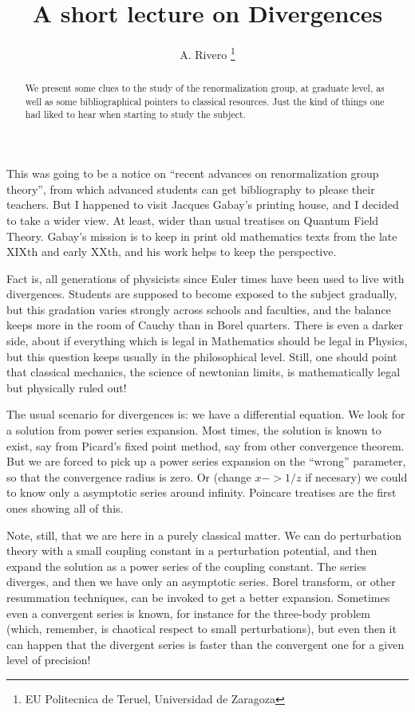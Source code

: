 \documentclass[a4paper,a4paper]{article}
\begin{document}
\title{A short lecture on Divergences}
\author{A. Rivero \thanks{EU Politecnica de Teruel, Universidad de Zaragoza}}
\maketitle
\begin{abstract}
We present some clues to the study of the renormalization group, at graduate level,
as well as some bibliographical pointers to classical resources. Just the kind
of things one had liked to hear when starting to study the subject.
\end{abstract}

This was going to be a notice on ``recent advances on renormalization group theory'', from 
which advanced students can get bibliography to please their teachers. But I happened to 
visit Jacques Gabay's printing house, and I decided to take a wider view. At least, wider 
than usual treatises on Quantum Field Theory. Gabay's mission is to keep in print old 
mathematics texts from the late XIXth and early XXth, and his work helps to keep the 
perspective.

Fact is, all generations of physicists since Euler times have been used to live with 
divergences. Students are supposed to become exposed to the subject gradually, but this 
gradation varies strongly across schools and faculties, and the balance keeps more in the 
room of Cauchy than in Borel quarters. There is even a darker side, about if everything 
which is legal in Mathematics should be legal in Physics, but this question keeps usually in 
the philosophical level. Still, one should point that classical mechanics, the science of 
newtonian limits, is mathematically legal but physically ruled out!

The usual scenario for divergences is: we have a differential equation. We look for a 
solution from power series expansion. Most times, the solution 
is known to exist, say from Picard's fixed point method, say from other convergence 
theorem. But we are forced to pick up a power series expansion on the ``wrong'' parameter, 
so that the convergence radius is zero. Or (change $x-> 1/z$ if necesary) we could to know 
only a asymptotic series around infinity. Poincare treatises are the first ones showing all of 
this. 

Note, still, that we are here in a purely classical matter. We can do perturbation theory with 
a small coupling constant in a perturbation potential, and then expand the solution as a 
power series of the coupling constant. The series diverges, and then we have only an 
asymptotic series. Borel transform, or other resummation techniques, can be invoked to get 
a better expansion.  Sometimes even a convergent series is known, for instance for the 
three-body problem (which, remember, is chaotical respect to small perturbations), but even 
then it can happen that the divergent series is faster than the convergent one for a given 
level of precision!
\end{document}
